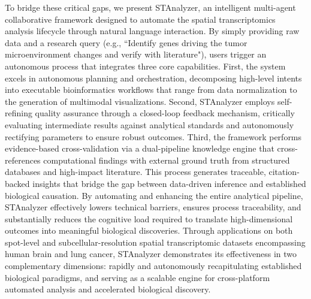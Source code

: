 \documentclass[11pt,a4paper]{article}
\begin{document}
To bridge these critical gaps, we present STAnalyzer, an intelligent multi-agent collaborative framework designed to automate the spatial transcriptomics analysis lifecycle through natural language interaction. By simply providing raw data and a research query (e.g., ``Identify genes driving the tumor microenvironment changes and verify with literature"), users trigger an autonomous process that integrates three core capabilities. First, the system excels in autonomous planning and orchestration, decomposing high-level intents into executable bioinformatics workflows that range from data normalization to the generation of multimodal visualizations. Second, STAnalyzer employs self-refining quality assurance through a closed-loop feedback mechanism, critically evaluating intermediate results against analytical standards and autonomously rectifying parameters to ensure robust outcomes. Third, the framework performs evidence-based cross-validation via a dual-pipeline knowledge engine that cross-references computational findings with external ground truth from structured databases and high-impact literature. This process generates traceable, citation-backed insights that bridge the gap between data-driven inference and established biological causation. By automating and enhancing the entire analytical pipeline, STAnalyzer effectively lowers technical barriers, ensures process traceability, and substantially reduces the cognitive load required to translate high-dimensional outcomes into meaningful biological discoveries. Through applications on both spot-level and subcellular-resolution spatial transcriptomic datasets encompassing human brain and lung cancer, STAnalyzer demonstrates its effectiveness in two complementary dimensions: rapidly and autonomously recapitulating established biological paradigms, and serving as a scalable engine for cross-platform automated analysis and accelerated biological discovery.

\end{document}
